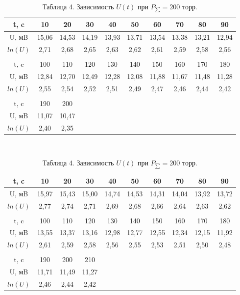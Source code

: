 \begin{table}
	\caption{Таблица 3. Зависимость $U(t)$ при $P_{\sum} = 150 $ торр.}
\begin{tabular}{| c | c | c | c | c | c | c | c | c | c |}
\hline
t, c & 10 & 20 & 30 & 40 & 50 & 60 & 70 & 80 & 90  \\ \hline
U, мB & 15,06 & 14,53 & 14,19 & 13,93 & 13,71 & 13,54 & 13,38 & 13,21 & 12,94  \\ \hline
$ln(U)$ & 2,71 & 2,68 & 2,65 & 2,63 & 2,62 & 2,61 & 2,59 & 2,58 & 2,56  \\ \hline
\\  \hline
t, c & 100 & 110 & 120 & 130 & 140 & 150 & 160 & 170 & 180    \\ \hline
U, мB & 12,84 & 12,70 & 12,49 & 12,28 & 12,08 & 11,88 & 11,67 & 11,48 & 11,28  \\ \hline
$ln(U)$ & 2,55 & 2,54 & 2,52 & 2,51 & 2,49 & 2,47 & 2,46 & 2,44 & 2,42 \\ \hline
\\  \hline
t, c & 190 & 200 &&&&&&&\\ \hline
U, мB & 11,07 & 10,47 &&&&&&&\\ \hline
$ln(U)$  & 2,40 & 2,35 &&&&&&&\\ \hline
\end{tabular}\\

	\caption{Таблица 4. Зависимость $U(t)$ при $P_{\sum} = 200 $ торр.}
\begin{tabular}{| c | c | c | c | c | c | c | c | c | c |}
\hline
t, c & 10 & 20 & 30 & 40 & 50 & 60 & 70 & 80 & 90 \\ \hline
U, мB & 15,97 & 15,43 & 15,00 & 14,74 & 14,53 & 14,31 & 14,04 & 13,92 & 13,72  \\ \hline
$ln(U)$ & 2,77 & 2,74 & 2,71 & 2,69 & 2,68 & 2,66 & 2,64 & 2,63 & 2,62   \\ \hline
\\  \hline
t, c & 100 & 110 & 120 & 130 & 140 & 150 & 160 & 170 & 180    \\ \hline
U, мB & 13,55 & 13,37 & 13,16 & 12,98 & 12,77 & 12,55 & 12,34 & 12,15 & 11,92   \\ \hline
$ln(U)$ & 2,61 & 2,59 & 2,58 & 2,56 & 2,55 & 2,53 & 2,51 & 2,50 & 2,48  \\ \hline
\\  \hline
t, c & 190 & 200 & 210 &&&&&&\\ \hline
U, мB & 11,71 & 11,49 & 11,27 &&&&&&\\ \hline
$ln(U)$ & 2,46 & 2,44 & 2,42 &&&&&&\\ \hline
\end{tabular}\\


\end{table}
